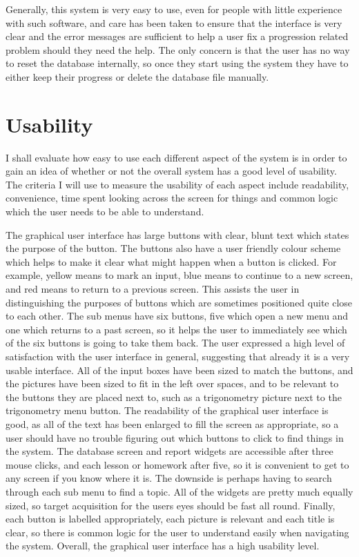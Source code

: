 Generally, this system is very easy to use, even for people with little experience with such software, and care has been taken to ensure that the interface is very clear and the error messages are sufficient to help a user fix a progression related problem should they need the help. The only concern is that the user has no way to reset the database internally, so once they start using the system they have to either keep their progress or delete the database file manually.

\section{Usability}

I shall evaluate how easy to use each different aspect of the system is in order to gain an idea of whether or not the overall system has a good level of usability. The criteria I will use to measure the usability of each aspect include readability, convenience, time spent looking across the screen for things and common logic which the user needs to be able to understand.

The graphical user interface has large buttons with clear, blunt text which states the purpose of the button. The buttons also have a user friendly colour scheme which helps to make it clear what might happen when a button is clicked. For example, yellow means to mark an input, blue means to continue to a new screen, and red means to return to a previous screen. This assists the user in distinguishing the purposes of buttons which are sometimes positioned quite close to each other. The sub menus have six buttons, five which open a new menu and one which returns to a past screen, so it helps the user to immediately see which of the six buttons is going to take them back. The user expressed a high level of satisfaction with the user interface in general, suggesting that already it is a very usable interface. All of the input boxes have been sized to match the buttons, and the pictures have been sized to fit in the left over spaces, and to be relevant to the buttons they are placed next to, such as a trigonometry picture next to the trigonometry menu button. The readability of the graphical user interface is good, as all of the text has been enlarged to fill the screen as appropriate, so a user should have no trouble figuring out which buttons to click to find things in the system. The database screen and report widgets are accessible after three mouse clicks, and each lesson or homework after five, so it is convenient to get to any screen if you know where it is. The downside is perhaps having to search through each sub menu to find a topic. All of the widgets are pretty much equally sized, so target acquisition for the users eyes should be fast all round. Finally, each button is labelled appropriately, each picture is relevant and each title is clear, so there is common logic for the user to understand easily when navigating the system. Overall, the graphical user interface has a high usability level.

